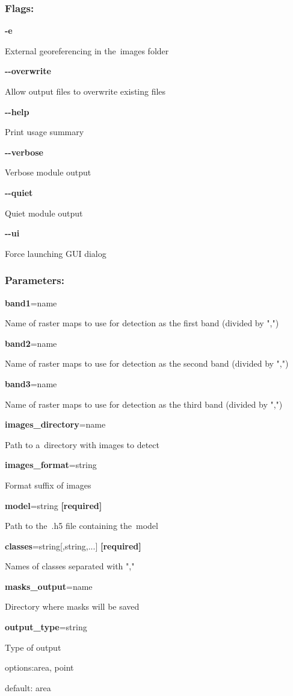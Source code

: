 \subsubsection*{Flags:}
\begin{flushleft}
  \textbf{-e}
  
  \tab External georeferencing in the~images folder
  
  \textbf{-{}-overwrite}
  
  \tab Allow output files to overwrite existing files
  
  \textbf{-{}-help}
  
  \tab Print usage summary
  
  \textbf{-{}-verbose}
  
  \tab Verbose module output
  
  \textbf{-{}-quiet}
  
  \tab Quiet module output
  
  \textbf{-{}-ui}
  
  \tab Force launching GUI dialog
\end{flushleft}

\subsubsection*{Parameters:}

\begin{flushleft}
\textbf{band1}=name

\tab Name of raster maps to use for detection as the first band
(divided by ",")

\textbf{band2}=name

\tab Name of raster maps to use for detection as the second band
(divided by ",")

\textbf{band3}=name

\tab Name of raster maps to use for detection as the third band
(divided by ",")

\textbf{images\_directory}=name

\tab Path to a~directory with images to detect

\textbf{images\_format}=string

\tab Format suffix of images

\textbf{model}=string \textbf{[required]}

\tab Path to the~.h5 file containing the~model

\textbf{classes}=string[,string,...] \textbf{[required]}
           
\tab Names of classes separated with ","

\textbf{masks\_output}=name

\tab Directory where masks will be saved

\textbf{output\_type}=string

\tab Type of output

\tab options:area, point

\tab default: area
\end{flushleft}

